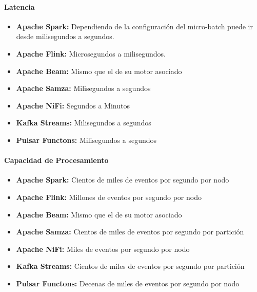 \paragraph{Latencia}
\begin{itemize}
    \item \textbf{Apache Spark:} Dependiendo de la configuración del micro-batch puede ir desde milisegundos a segundos.
    \item \textbf{Apache Flink:} Microsegundos a milisegundos.
    \item \textbf{Apache Beam:} Mismo que el de su motor asociado 
    \item \textbf{Apache Samza:} Milisegundos a segundos
    \item \textbf{Apache NiFi:} Segundos a Minutos
    \item \textbf{Kafka Streams:} Milisegundos a segundos
    \item \textbf{Pulsar Functons:} Milisegundos a segundos
\end{itemize}

\paragraph{Capacidad de Procesamiento}
\begin{itemize}
    \item \textbf{Apache Spark:} Cientos de miles de eventos por segundo por nodo
    \item \textbf{Apache Flink:} Millones de eventos por segundo por nodo
    \item \textbf{Apache Beam:} Mismo que el de su motor asociado 
    \item \textbf{Apache Samza:} Cientos de miles de eventos por segundo por partición
    \item \textbf{Apache NiFi:} Miles de eventos por segundo por nodo
    \item \textbf{Kafka Streams:} Cientos de miles de eventos por segundo por partición
    \item \textbf{Pulsar Functons:} Decenas de miles de eventos por segundo por nodo
\end{itemize}

